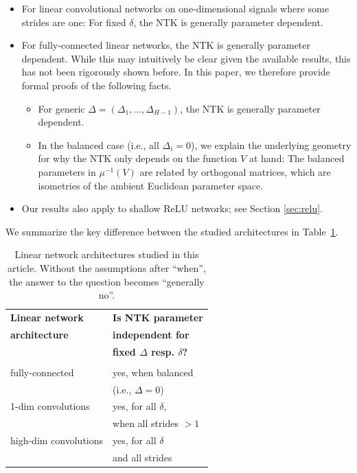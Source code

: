 \documentclass[twoside]{article}
\theoremstyle{definition}
\theoremstyle{remark}
\begin{document}
\begin{itemize}
    \item For linear convolutional networks on one-dimensional signals where some strides are one: For fixed $\delta$, the NTK is generally parameter dependent.
    \item For fully-connected linear networks, the NTK is generally parameter dependent. While this may intuitively be clear given the available results, this has not been rigorously shown before. In this paper, we therefore provide formal proofs of the following facts.
\begin{itemize}
    \item For generic $\Delta = (\Delta_1, \ldots, \Delta_{H-1}) $, the NTK is generally parameter dependent.
    \item In the balanced case (i.e., all $\Delta_i=0$), we explain the underlying geometry for why the NTK only depends on the function $V$ at hand: The balanced parameters in $\mu^{-1}(V)$ are related by orthogonal matrices, which are isometries of the ambient Euclidean parameter space. %
\end{itemize}
\item Our results also apply to shallow ReLU networks; see Section \ref{sec:relu}.
\end{itemize}



We summarize the key difference between the studied architectures in Table~\ref{tab:table}.


\begin{table}[h]
\begin{tabular}{ll}
\textbf{Linear network}  &\textbf{Is NTK parameter} \\
\textbf{architecture}  &\textbf{independent for} \\
\textbf{}  &\textbf{fixed $\Delta$ resp. $\delta$?} \\
\hline \\
fully-connected         &yes, when balanced  \\
                         &(i.e., $\Delta=0$) \\
1-dim convolutions             &yes, for all $\delta$, \\
                             & when all strides $>1$ \\
high-dim convolutions             &yes, for all $\delta$  \\
                                    & and all strides \\
\end{tabular}
\caption{Linear network architectures studied in this article. Without the assumptions after ``when'', the answer to the question becomes ``generally no''.} 
\label{tab:table}
\end{table}
\end{document}
